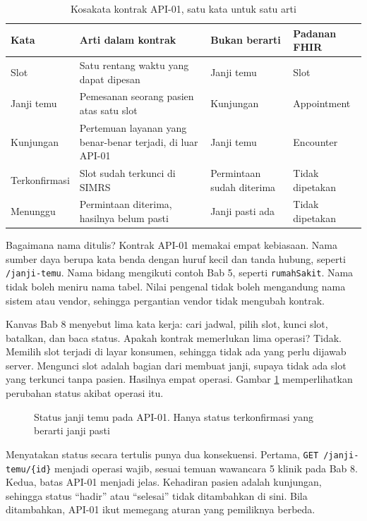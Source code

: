 \begin{table}[!htb]
  \centering
  \caption{Kosakata kontrak API-01, satu kata untuk satu arti}
  \label{tab:ch09-kosakata}
  \footnotesize
  \begin{tabularx}{\textwidth}{H{2.2cm}GH{2.8cm}H{1.8cm}}
    \hline
    \textbf{Kata} & \textbf{Arti dalam kontrak} & \textbf{Bukan berarti} & \textbf{Padanan FHIR} \\ \hline
    Slot & Satu rentang waktu yang dapat dipesan & Janji temu & Slot \\ \hline
    Janji temu & Pemesanan seorang pasien atas satu slot & Kunjungan & Appointment \\ \hline
    Kunjungan & Pertemuan layanan yang benar-benar terjadi, di luar API-01 & Janji temu & Encounter \\ \hline
    Terkonfirmasi & Slot sudah terkunci di SIMRS & Permintaan sudah diterima & Tidak dipetakan \\ \hline
    Menunggu & Permintaan diterima, hasilnya belum pasti & Janji pasti ada & Tidak dipetakan \\ \hline
  \end{tabularx}
\end{table}

Bagaimana nama ditulis? Kontrak API-01 memakai empat kebiasaan. Nama sumber daya berupa kata benda dengan huruf kecil dan tanda hubung,
seperti \texttt{/janji-temu}. Nama bidang mengikuti contoh Bab 5, seperti \texttt{rumahSakit}. Nama tidak boleh meniru nama tabel. Nilai
pengenal tidak boleh mengandung nama sistem atau vendor, sehingga pergantian vendor tidak mengubah kontrak.

Kanvas Bab 8 menyebut lima kata kerja: cari jadwal, pilih slot, kunci slot, batalkan, dan baca status. Apakah kontrak memerlukan lima
operasi? Tidak. Memilih slot terjadi di layar konsumen, sehingga tidak ada yang perlu dijawab server. Mengunci slot adalah bagian dari
membuat janji, supaya tidak ada slot yang terkunci tanpa pasien. Hasilnya empat operasi. Gambar \ref{fig:ch09-status} memperlihatkan perubahan
status akibat operasi itu.

\begin{figure}[!htb]
  \centering
  
  \caption{Status janji temu pada API-01. Hanya status terkonfirmasi yang berarti janji pasti}
  \label{fig:ch09-status}
\end{figure}

Menyatakan status secara tertulis punya dua konsekuensi. Pertama, \texttt{GET /janji-temu/\{id\}} menjadi operasi wajib, sesuai temuan
wawancara 5 klinik pada Bab 8. Kedua, batas API-01 menjadi jelas. Kehadiran pasien adalah kunjungan, sehingga status ``hadir'' atau ``selesai''
tidak ditambahkan di sini. Bila ditambahkan, API-01 ikut memegang aturan yang pemiliknya berbeda.

